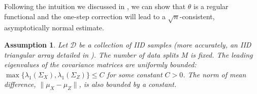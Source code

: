 \documentclass[11pt]{article}
\newtheorem{assumption}[theorem]{Assumption}
\begin{document}






Following the intuition we discussed in , we can show that $\theta$ is a regular functional and the one-step correction will lead to a $\sqrt{n}$-consistent, asymptotically normal estimate.

\begin{assumption}\label{assumption: basic}
Let $\mathcal{D}$ be a collection of IID samples (more accurately, an IID triangular array detailed in ). The number of data splits $M$ is fixed. The leading eigenvalues of the covariance matrices are uniformly bounded:
$
\max\{\lambda_1\left(\Sigma_X\right), \lambda_1\left(\Sigma_Z\right)\} \leq C
$
for some constant $C>0$. The norm of mean difference, $\|\mu_X - \mu_Z\|$, is also bounded by a constant.
\end{assumption}
\end{document}
